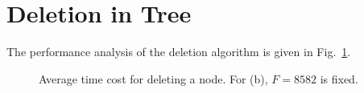 \documentclass[sigconf,pdftex]{acmart}
\begin{document}
\section{Deletion in Tree}\label{app-TreeDelete}
The performance analysis of the deletion algorithm is given in Fig.~\ref{fig:deletion}.
\begin{figure}[!h]
        \hfill
    
  \caption{Average time cost for deleting a node. For (b), $F= 8582$ is fixed.}
  \label{fig:deletion} 
\end{figure}
\end{document}
